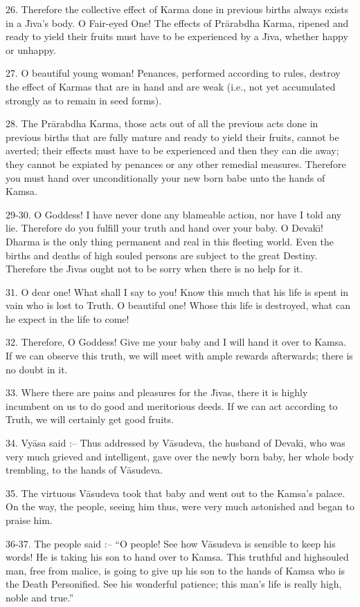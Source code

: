 26. Therefore the collective effect of Karma done in previous births always exists in a J\={\i}va's body. O Fair-eyed One! The effects of Pr\=arabdha Karma, ripened and ready to yield their fruits must have to be experienced by a J\={\i}va, whether happy or unhappy.

27. O beautiful young woman! Penances, performed according to rules, destroy the effect of Karmas that are in hand and are weak (i.e., not yet accumulated strongly as to remain in seed forms).

28. The Pr\=arabdha Karma, those acts out of all the previous acts done in previous births that are fully mature and ready to yield their fruits, cannot be averted; their effects must have to be experienced and then they can die away; they cannot be expiated by penances or any other remedial measures. Therefore you must hand over unconditionally your new born babe unto the hands of Kamsa.

29-30. O Goddess! I have never done any blameable action, nor have I told any lie. Therefore do you fulfill your truth and hand over your baby. O Devak\={\i}! Dharma is the only thing permanent and real in this fleeting world. Even the births and deaths of high souled persons are subject to the great Destiny. Therefore the J\={\i}vas ought not to be sorry when there is no help for it.

31. O dear one! What shall I say to you! Know this much that his life is spent in vain who is lost to Truth. O beautiful one! Whose this life is destroyed, what can he expect in the life to come!

32. Therefore, O Goddess! Give me your baby and I will hand it over to Kamsa. If we can observe this truth, we will meet with ample rewards afterwards; there is no doubt in it.

33. Where there are pains and pleasures for the J\={\i}vas, there it is highly incumbent on us to do good and meritorious deeds. If we can act according to Truth, we will certainly get good fruits.

34. Vy\=asa said :-- Thus addressed by V\=asudeva, the husband of Devak\={\i}, who was very much grieved and intelligent, gave over the newly born baby, her whole body trembling, to the hands of V\=asudeva.

35. The virtuous V\=asudeva took that baby and went out to the Kamsa's palace. On the way, the people, seeing him thus, were very much astonished and began to praise him.

36-37. The people said :-- ``O people! See how V\=asudeva is sensible to keep his words! He is taking his son to hand over to Kamsa. This truthful and highsouled man, free from malice, is going to give up his son to the hands of Kamsa who is the Death Personified. See his wonderful patience; this man's life is really high, noble and true.''

